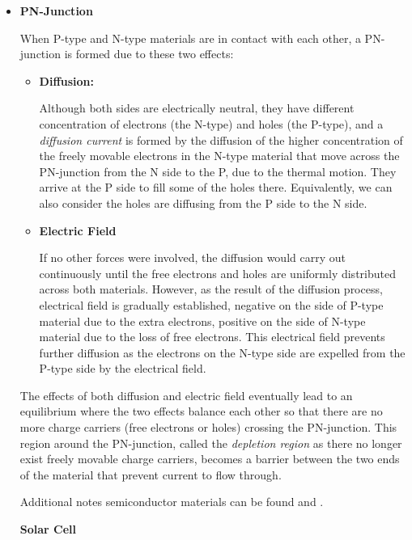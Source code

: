 \begin{itemize}
\item {\bf PN-Junction}

When P-type and N-type materials are in contact with each other, a 
PN-junction is formed due to these two effects:
\begin{itemize}
\item {\bf Diffusion:}

Although both sides are electrically neutral, they have different
concentration of electrons (the N-type) and holes (the P-type), and 
a {\em diffusion current} is formed by the diffusion of the higher
concentration of the freely movable electrons in the N-type material 
that move across the PN-junction from the N side to the P, due to the
thermal motion. They arrive at the P side to fill some of the holes
there. Equivalently, we can also consider the holes are diffusing
from the P side to the N side.

\item {\bf Electric Field}

If no other forces were involved, the diffusion would carry out 
continuously until the free electrons and holes are uniformly distributed
across both materials. However, as the result of the diffusion process,
electrical field is gradually established, negative on the side of P-type 
material due to the extra electrons, positive on the side of N-type 
material due to the loss of free electrons. This electrical field prevents
further diffusion as the electrons on the N-type side are expelled from
the P-type side by the electrical field.

\end{itemize}



The effects of both diffusion and electric field eventually lead to an 
equilibrium where the two effects balance each other so that there are
no more charge carriers (free electrons or holes) crossing the PN-junction.
This region around the PN-junction, called the {\em depletion region} as 
there no longer exist freely movable charge carriers, becomes a barrier 
between the two ends of the material that prevent current to flow through.

Additional notes semiconductor materials can be found
 and
.

{\bf Solar Cell}


\end{itemize}

